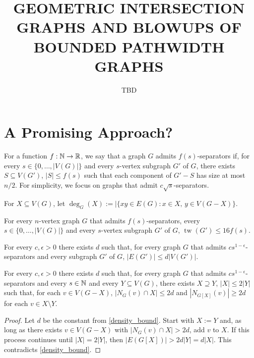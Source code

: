 \documentclass{patmorin}
\title{\MakeUppercase{\boldmath Geometric Intersection Graphs and Blowups of Bounded Pathwidth Graphs}}
\author{TBD}
\date{}
\renewcommand{\ge}{\geqslant}
\renewcommand{\le}{\leqslant}
\DeclareMathOperator{\tw}{tw}
\begin{document}
\maketitle

\section{A Promising Approach?}

For a function $f:\mathbb{N}\to\mathbb{R}$, we say that a graph $G$ admits $f(s)$-separators if, for every $s\in\{0,\ldots,|V(G)|\}$ and every $s$-vertex subgraph $G'$ of $G$, there exists $S\subseteq V(G')$, $|S|\le f(s)$ such that each component of $G'-S$ has size at most $n/2$.  For simplicity, we focus on graphs that admit $c\sqrt{s}$-separators.

For $X\subseteq V(G)$, let $\deg_G(X):=|\{xy\in E(G):x\in X,\, y\in V(G-X)\}$.


\begin{thm}\label{dvorak_norin}
  For every $n$-vertex graph $G$ that admits $f(s)$-separators, every $s\in\{0,\ldots,|V(G)|\}$ and every $s$-vertex subgraph $G'$ of $G$, $\tw(G')\le 16 f(s)$.
\end{thm}

\begin{thm}[??]\label{density_bound}
  For every $c,\epsilon >0$ there exists $d$ such that, for every  graph $G$ that admits $cs^{1-\epsilon}$-separators and every  subgraph $G'$ of $G$, $|E(G')|\le d|V(G')|$.
\end{thm}

\begin{lem}\label{degree_bounder}
  For every $c,\epsilon >0$ there exists $d$ such that, for every  graph $G$ that admits $cs^{1-\epsilon}$-separators and every $s\in\mathbb{N}$ and every $Y\subseteq V(G)$, there exists $X\supseteq Y$, $|X|\le 2|Y|$ such that, for each $v\in V(G-X)$,  $|N_G(v)\cap X|\le 2d$ and $|N_{G[X]}(v)|\ge 2d$ for each $v\in X\setminus Y$.
\end{lem}

\begin{proof}
  Let $d$ be the constant from \cref{density_bound}.
  Start with $X:=Y$ and, as long as there exists $v\in V(G-X)$ with $|N_G(v)\cap X|> 2d$, add $v$ to $X$.  If this process continues until $|X|=2|Y|$, then $|E(G[X])|> 2d|Y|=d|X|$.  This contradicts \cref{density_bound}.
\end{proof}
\end{document}
